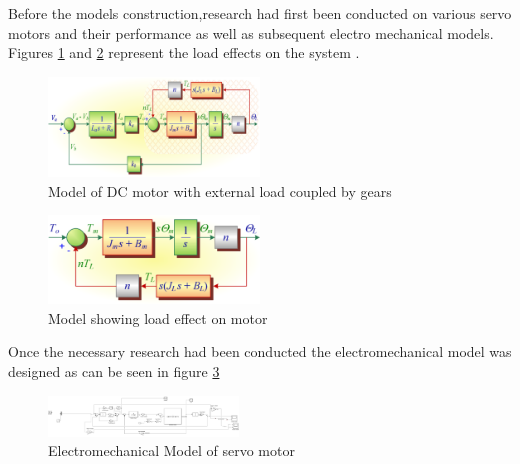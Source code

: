 Before the models construction,research had first been conducted on various servo motors and their performance as well as subsequent electro mechanical models. Figures \ref{fig:Model of DC motor with external load coupled by gears} and \ref{fig:Model Showing Load Effect on motor} represent the load effects on the system .\\

\begin{figure}[h]
 \centering
   \includegraphics[width = 0.5\textwidth]{figures/5.png}                \caption{Model of DC motor with external load coupled by gears}
   \label{fig:Model of DC motor with external load coupled by gears}
\end{figure}

\begin{figure}[h]
 \centering
   \includegraphics[width = 0.5\textwidth]{figures/6.png}                \caption{Model showing load effect on motor}
   \label{fig:Model Showing Load Effect on motor}
\end{figure}





Once the necessary research had been conducted the electromechanical model was designed as can be seen in figure \ref{fig:Electromechanical Model}


\begin{figure}[H]
 \centering
   \includegraphics[width = 0.45\textwidth]{figures/7.png}  \caption{Electromechanical Model of servo motor}
   \label{fig:Electromechanical Model}
\end{figure}

